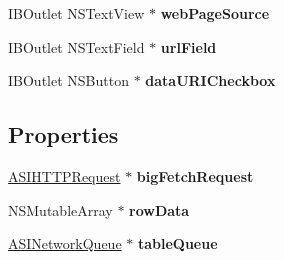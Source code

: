 \begin{DoxyCompactItemize}
\item 
\hypertarget{interface_app_delegate_ac645c5540a091b1cc3202f3399fcbd47}{
\-I\-B\-Outlet \-N\-S\-Text\-View $\ast$ {\bfseries web\-Page\-Source}}
\label{interface_app_delegate_ac645c5540a091b1cc3202f3399fcbd47}

\item 
\hypertarget{interface_app_delegate_aadf5bef42410300042a57e47609e74bc}{
\-I\-B\-Outlet \-N\-S\-Text\-Field $\ast$ {\bfseries url\-Field}}
\label{interface_app_delegate_aadf5bef42410300042a57e47609e74bc}

\item 
\hypertarget{interface_app_delegate_a2193a7b485c56ef65449de1f43bbdf5b}{
\-I\-B\-Outlet \-N\-S\-Button $\ast$ {\bfseries data\-U\-R\-I\-Checkbox}}
\label{interface_app_delegate_a2193a7b485c56ef65449de1f43bbdf5b}

\end{DoxyCompactItemize}
\subsection*{\-Properties}
\begin{DoxyCompactItemize}
\item 
\hypertarget{interface_app_delegate_a4841b0f24432aa2c3144a82f4d1380ca}{
\hyperlink{interface_a_s_i_h_t_t_p_request}{\-A\-S\-I\-H\-T\-T\-P\-Request} $\ast$ {\bfseries big\-Fetch\-Request}}
\label{interface_app_delegate_a4841b0f24432aa2c3144a82f4d1380ca}

\item 
\hypertarget{interface_app_delegate_a03792b0d04b364575fba41387f7a5300}{
\-N\-S\-Mutable\-Array $\ast$ {\bfseries row\-Data}}
\label{interface_app_delegate_a03792b0d04b364575fba41387f7a5300}

\item 
\hypertarget{interface_app_delegate_ae293d1268f425b1e8c7da08d6935817a}{
\hyperlink{interface_a_s_i_network_queue}{\-A\-S\-I\-Network\-Queue} $\ast$ {\bfseries table\-Queue}}
\label{interface_app_delegate_ae293d1268f425b1e8c7da08d6935817a}

\end{DoxyCompactItemize}


